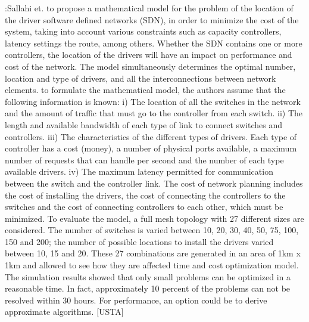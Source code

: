 \documentclass[a4paper,10pt]{article}
\begin{document}
\cite{SaSt15}:Sallahi et. to propose a mathematical model for the problem of the location of the driver software defined networks (SDN), in order to minimize the cost of the system, taking into account various constraints such as capacity controllers, latency settings the route, among others. Whether the SDN contains one or more controllers, the location of the drivers will have an impact on performance and cost of the network. The model simultaneously determines the optimal number, location and type of drivers, and all the interconnections between network elements.
to formulate the mathematical model, the authors assume that the following information is known: i) The location of all the switches in the network and the amount of traffic that must go to the controller from each switch. ii) The length and available bandwidth of each type of link to connect switches and controllers. iii) The characteristics of the different types of drivers. Each type of controller has a cost (money), a number of physical ports available, a maximum number of requests that can handle per second and the number of each type available drivers. iv) The maximum latency permitted for communication between the switch and the controller link.
The cost of network planning includes the cost of installing the drivers, the cost of connecting the controllers to the switches and the cost of connecting controllers to each other, which must be minimized.
To evaluate the model, a full mesh topology with 27 different sizes are considered. The number of switches is varied between 10, 20, 30, 40, 50, 75, 100, 150 and 200; the number of possible locations to install the drivers varied between 10, 15 and 20. These 27 combinations are generated in an area of 1km x 1km and allowed to see how they are affected time and cost optimization model. The simulation results showed that only small problems can be optimized in a reasonable time. In fact, approximately 10 percent of the problems can not be resolved within 30 hours. For performance, an option could be to derive approximate algorithms.
[USTA]
\end{document}
